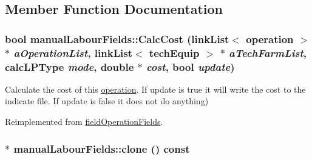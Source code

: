 \subsection{Member Function Documentation}
\hypertarget{classmanual_labour_fields_a1baebed54c58272b5127e0fe713b1eea}{
\subsubsection[{CalcCost}]{\setlength{\rightskip}{0pt plus 5cm}bool manualLabourFields::CalcCost ({\bf linkList}$<$ {\bf operation} $>$ $\ast$ {\em aOperationList}, \/  {\bf linkList}$<$ {\bf techEquip} $>$ $\ast$ {\em aTechFarmList}, \/  {\bf calcLPType} {\em mode}, \/  double $\ast$ {\em cost}, \/  bool {\em update})}}
\label{classmanual_labour_fields_a1baebed54c58272b5127e0fe713b1eea}
Calculate the cost of this \hyperlink{classoperation}{operation}. If update is true it will write the cost to the indicate file. If update is false it does not do anything) 

Reimplemented from \hyperlink{classfield_operation_fields_aeb2bce9d4612033dbab366d870e432a6}{fieldOperationFields}.\hypertarget{classmanual_labour_fields_acbf577ca188715bf0e4413f08e6d2861}{
\subsubsection[{clone}]{ $\ast$ manualLabourFields::clone () const}}
\label{classmanual_labour_fields_acbf577ca188715bf0e4413f08e6d2861}


